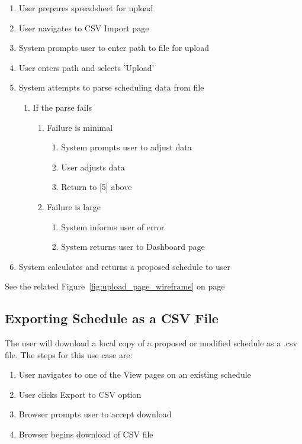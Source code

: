 \documentclass{extarticle}
\begin{document}
\begin{appendices}
\begin{enumerate}
    \item User prepares spreadsheet for upload
    \item User navigates to CSV Import page
    \item System prompts user to enter path to file for upload
    \item User enters path and selects 'Upload'
    \item System attempts to parse scheduling data from file
        \begin{enumerate}
            \item If the parse fails
            \begin{enumerate}
                \item Failure is minimal
                \begin{enumerate}
                    \item System prompts user to adjust data
                    \item User adjusts data
                    \item Return to [5] above
                \end{enumerate}
                \item Failure is large
                \begin{enumerate}
                    \item System informs user of error
                    \item System returns user to Dashboard page
                \end{enumerate}
            \end{enumerate}
        \end{enumerate}
    \item System calculates and returns a proposed schedule to user
\end{enumerate}

See the related Figure~\ref{fig:upload_page_wireframe} on page~\pageref{fig:upload_page_wireframe}

\subsection{Exporting Schedule as a CSV File}
The user will download a local copy of a proposed or modified schedule as a .csv file.  The steps for this use
case are:

\begin{enumerate}
    \item User navigates to one of the View pages on an existing schedule
    \item User clicks Export to CSV option
    \item Browser prompts user to accept download
    \item Browser begins download of CSV file
\end{enumerate}


\end{appendices}
\end{document}
